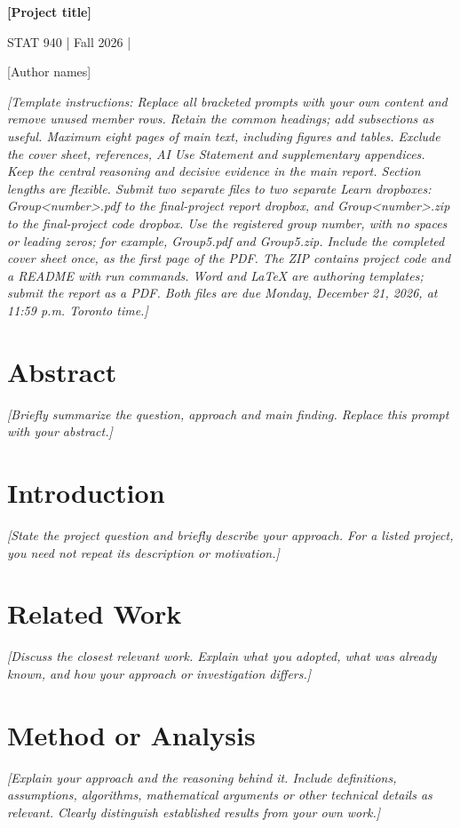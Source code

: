 \documentclass[12pt,letterpaper]{article}
\newcommand{\prompt}[1]{{\interlinepenalty=10000\textit{[#1]}\par}}
\begin{document}
\pagestyle{empty}


\clearpage
\pagestyle{plain}
\setcounter{page}{1}
{\fontsize{16}{18}\selectfont\bfseries [Project title]}\par
STAT 940 \quad | \quad Fall 2026 \quad | 

[Author names]

\prompt{Template instructions: Replace all bracketed prompts with your own content and remove unused member rows. Retain the common headings; add subsections as useful. Maximum eight pages of main text, including figures and tables. Exclude the cover sheet, references, AI Use Statement and supplementary appendices. Keep the central reasoning and decisive evidence in the main report. Section lengths are flexible. Submit two separate files to two separate Learn dropboxes: Group\textless{}number\textgreater{}.pdf to the final-project report dropbox, and Group\textless{}number\textgreater{}.zip to the final-project code dropbox. Use the registered group number, with no spaces or leading zeros; for example, Group5.pdf and Group5.zip. Include the completed cover sheet once, as the first page of the PDF. The ZIP contains project code and a README with run commands. Word and LaTeX are authoring templates; submit the report as a PDF. Both files are due Monday, December 21, 2026, at 11:59 p.m. Toronto time.}

\section*{Abstract}
\prompt{Briefly summarize the question, approach and main finding. Replace this prompt with your abstract.}

\section{Introduction}
\prompt{State the project question and briefly describe your approach. For a listed project, you need not repeat its description or motivation.}

\section{Related Work}
\prompt{Discuss the closest relevant work. Explain what you adopted, what was already known, and how your approach or investigation differs.}

\section{Method or Analysis}
\prompt{Explain your approach and the reasoning behind it. Include definitions, assumptions, algorithms, mathematical arguments or other technical details as relevant. Clearly distinguish established results from your own work.}
\end{document}
